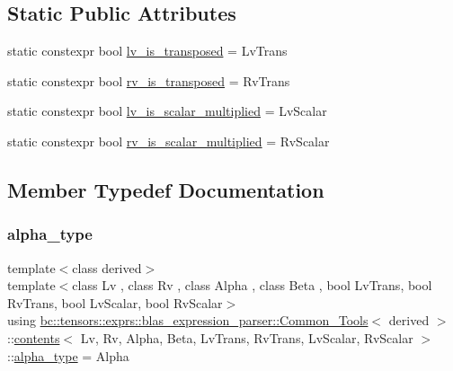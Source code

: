 \subsection*{Static Public Attributes}
\begin{DoxyCompactItemize}
\item 
static constexpr bool \hyperlink{structbc_1_1tensors_1_1exprs_1_1blas__expression__parser_1_1Common__Tools_1_1contents_a70834b5071003cd8b6992a2304e4fb9d}{lv\+\_\+is\+\_\+transposed} = Lv\+Trans
\item 
static constexpr bool \hyperlink{structbc_1_1tensors_1_1exprs_1_1blas__expression__parser_1_1Common__Tools_1_1contents_a51b226f3f78726dec6c1258666413ace}{rv\+\_\+is\+\_\+transposed} = Rv\+Trans
\item 
static constexpr bool \hyperlink{structbc_1_1tensors_1_1exprs_1_1blas__expression__parser_1_1Common__Tools_1_1contents_a9f90c8ea703abb0df65351cc7aac9d85}{lv\+\_\+is\+\_\+scalar\+\_\+multiplied} = Lv\+Scalar
\item 
static constexpr bool \hyperlink{structbc_1_1tensors_1_1exprs_1_1blas__expression__parser_1_1Common__Tools_1_1contents_aa3582413ebfd55000dff65b816b7d40a}{rv\+\_\+is\+\_\+scalar\+\_\+multiplied} = Rv\+Scalar
\end{DoxyCompactItemize}


\subsection{Member Typedef Documentation}
\mbox{\label{structbc_1_1tensors_1_1exprs_1_1blas__expression__parser_1_1Common__Tools_1_1contents_a75868f11a9cd4889bad56732956fa26e}} 
\subsubsection{\texorpdfstring{alpha\+\_\+type}{alpha\_type}}
{\footnotesize\ttfamily template$<$class derived$>$ \\
template$<$class Lv , class Rv , class Alpha , class Beta , bool Lv\+Trans, bool Rv\+Trans, bool Lv\+Scalar, bool Rv\+Scalar$>$ \\
using \hyperlink{structbc_1_1tensors_1_1exprs_1_1blas__expression__parser_1_1Common__Tools}{bc\+::tensors\+::exprs\+::blas\+\_\+expression\+\_\+parser\+::\+Common\+\_\+\+Tools}$<$ derived $>$\+::\hyperlink{structbc_1_1tensors_1_1exprs_1_1blas__expression__parser_1_1Common__Tools_1_1contents}{contents}$<$ Lv, Rv, Alpha, Beta, Lv\+Trans, Rv\+Trans, Lv\+Scalar, Rv\+Scalar $>$\+::\hyperlink{structbc_1_1tensors_1_1exprs_1_1blas__expression__parser_1_1Common__Tools_1_1contents_a75868f11a9cd4889bad56732956fa26e}{alpha\+\_\+type} =  Alpha}

